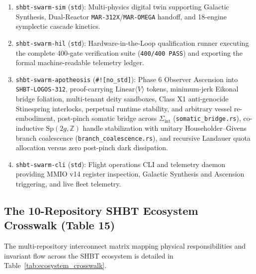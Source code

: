 \documentclass[11pt,onecolumn]{article}
\begin{document}
\begin{enumerate}
    \item \texttt{shbt-swarm-sim} (\texttt{std}): Multi-physics digital twin supporting Galactic Synthesis, Dual-Reactor \texttt{MAR-312X}/\texttt{MAR-OMEGA} handoff, and 18-engine symplectic cascade kinetics.
    \item \texttt{shbt-swarm-hil} (\texttt{std}): Hardware-in-the-Loop qualification runner executing the complete 400-gate verification suite (\texttt{400/400 PASS}) and exporting the formal machine-readable telemetry ledger.
    \item \texttt{shbt-swarm-apotheosis} (\texttt{\#![no\_std]}): Phase 6 Observer Ascension into \texttt{SHBT-LOGOS-312}, proof-carrying $\text{Linear}\langle V\rangle$ tokens, minimum-jerk Eikonal bridge foliation, multi-tenant deity sandboxes, Class X1 anti-genocide Stinespring interlocks, perpetual runtime stability, and arbitrary vessel re-embodiment, post-pinch somatic bridge across $\Sigma_{\mathrm{int}}$ (\texttt{somatic\_bridge.rs}), co-inductive $\mathrm{Sp}(2g,\mathbb{Z})$ handle stabilization with unitary Householder--Givens branch coalescence (\texttt{branch\_coalescence.rs}), and recursive Landauer quota allocation versus zero post-pinch dark dissipation.
    \item \texttt{shbt-swarm-cli} (\texttt{std}): Flight operations CLI and telemetry daemon providing MMIO v14 register inspection, Galactic Synthesis and Ascension triggering, and live fleet telemetry.
\end{enumerate}

\FloatBarrier
\subsection{The 10-Repository SHBT Ecosystem Crosswalk (Table 15)}
The multi-repository interconnect matrix mapping physical responsibilities and invariant flow across the SHBT ecosystem is detailed in Table~\ref{tab:ecosystem_crosswalk}.
\end{document}
